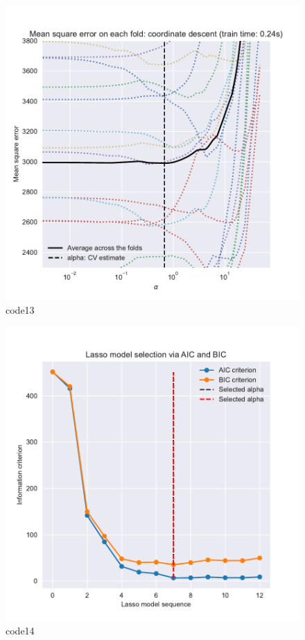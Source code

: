 \begin{figure}[htbp]
	\centering
	\includegraphics[width=14cm]{codeimage/code13}
	\caption{code13}
	\label{code13}
\end{figure}

\begin{PythonCode}\label{例10}
	
\end{PythonCode}

\begin{figure}[htbp]
	\centering
	\includegraphics[width=14cm]{codeimage/code14}
	\caption{code14}
	\label{code14}
\end{figure}

